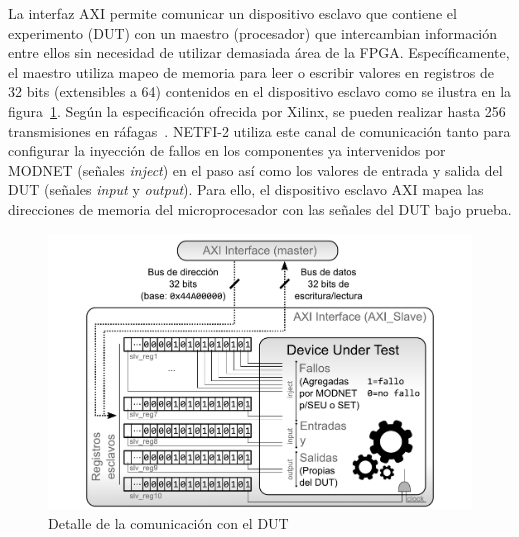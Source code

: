 \documentclass[a4paper,openright,12pt]{report}
\newcommand*\circled[1]{\tikz[baseline=(char.base)]{
            \node[shape=circle,draw,inner sep=0.7pt] (char) {#1};}}
\begin{document}
La interfaz AXI permite comunicar un dispositivo esclavo que contiene el experimento (DUT) con un maestro (procesador) que intercambian información entre ellos sin necesidad de utilizar demasiada área de la FPGA. Específicamente, el maestro utiliza mapeo de memoria para leer o escribir valores en registros de 32 bits (extensibles a 64) contenidos en el dispositivo esclavo como se ilustra en la figura~\ref{axi}. Según la especificación ofrecida por Xilinx, se pueden realizar hasta 256 transmisiones en ráfagas~\cite{AXI}. NETFI-2 utiliza este canal de comunicación tanto para configurar la inyección de fallos en los componentes ya intervenidos por MODNET (señales \emph{inject}) en el paso \circled{2} así como los valores de entrada y salida del DUT (señales \emph{input} y \emph{output}). Para ello, el dispositivo esclavo AXI mapea las direcciones de memoria del microprocesador con las señales del DUT bajo prueba.

\begin{figure}[H]
	\centering
	\includegraphics[width=0.75 \textwidth]{img/axi.pdf}
	\caption{Detalle de la comunicación con el DUT}
	\label{axi}
\end{figure}

\lstset{frame=tb,
  language=VHDL,
  aboveskip=3mm,
  belowskip=3mm,
  showstringspaces=false,
  columns=flexible,
  basicstyle=\ttfamily,
  numbers=none,
  breakatwhitespace=true,
  tabsize=2
}
\end{document}
